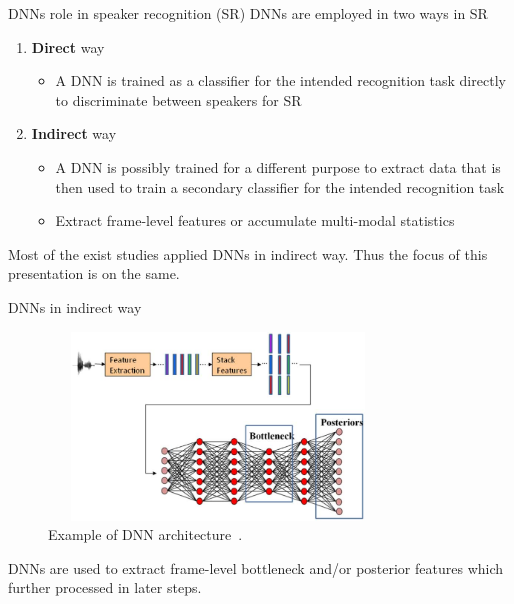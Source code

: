 \documentclass{beamer}
\begin{document}
\begin{frame}{DNNs role in speaker recognition (SR)}
  DNNs are employed in two ways in SR
  \begin{enumerate}
      \item \textbf{Direct} way~\cite{Variani2014}
            \begin{itemize}
              \item{A DNN is trained as a classifier for the intended recognition task directly to discriminate between speakers for SR}
            \end{itemize}
       \item \textbf{Indirect} way~\cite{Yun_Lei2014}
       \begin{itemize}
           \item{A DNN is possibly trained for a different purpose to extract data that is then used to train a secondary classifier for the intended recognition task}
           \item{Extract frame-level features or accumulate multi-modal statistics}
       \end{itemize}
  \end{enumerate}
  
  Most of the exist studies applied DNNs in indirect way. Thus the focus of this presentation is on the same.
\end{frame}

\begin{frame}{DNNs in indirect way}
 \begin{figure}
      \centering
      \includegraphics[width=9cm, height=5cm]{figures/indirect_dnns}
      \caption{Example of DNN architecture~\cite{Richardson2015}.}
      \label{fig:dnn_example}
  \end{figure}
 DNNs are used to extract frame-level bottleneck and/or posterior features which further processed in later steps.
\end{frame}
\end{document}
